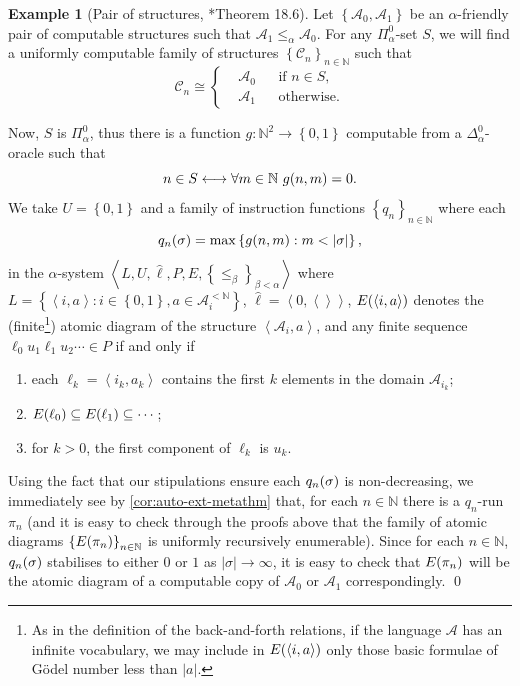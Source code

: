 \documentclass[11pt]{article}
\theoremstyle{plain}
\theoremstyle{definition}
\newtheorem*{example}{Example}
\newcommand{\tuple}[1]{\left\langle #1 \right\rangle}
\begin{document}
\begin{example}[Pair of structures, \cite{ash-knight00-computable-structures}*{Theorem 18.6}]
  Let $\left\{\mathcal{A}_0, \mathcal{A}_1\right\}$ be an $\alpha$-friendly pair of computable structures such that $\mathcal{A}_1 \leq_\alpha \mathcal{A}_0$. For any $\Pi^0_\alpha$-set $S$, we will find a uniformly computable family of structures $\left\{\mathcal{C}_n\right\}_{n \in \mathbb{N}}$ such that
  \[\mathcal{C}_n \cong \left\{\begin{aligned}
       & \mathcal{A}_0 &  & \text{if } n \in S, \\
       & \mathcal{A}_1 &  & \text{otherwise}.
    \end{aligned}\right.\]

  Now, $S$ is $\Pi^0_\alpha$, thus there is a function $g : \mathbb{N}^2 \rightarrow \left\{0, 1\right\}$ computable from a $\Delta^0_\alpha$-oracle such that
  \[n \in S \longleftrightarrow \forall m \in \mathbb{N} \ g\mleft(n, m\mright) = 0.\]
  We take $U = \left\{0, 1\right\}$ and a family of instruction functions $\left\{q_n\right\}_{n \in \mathbb{N}}$ where each
  \[q_n\mleft(\sigma\mright) = \max \left\{g\mleft(n, m\mright) : m < \left|\sigma\right|\right\},\]
  in the $\alpha$-system $\tuple{L, U, \hat{\ell}, P, E, \left\{\leq_\beta\right\}_{\beta < \alpha}}$ where $L = \left\{\tuple{i, a} : i \in \left\{0, 1\right\}, a \in \mathcal{A}_i^{<\mathbb{N}}\right\}$, $\hat{\ell} = \tuple{0, \tuple{}}$, $E\mleft(\tuple{i, a}\mright)$ denotes the (finite\footnote{As in the definition of the back-and-forth relations, if the language $\mathcal{A}$ has an infinite vocabulary, we may include in $E\mleft(\tuple{i, a}\mright)$ only those basic formulae of G\"odel number less than $\left|a\right|$.}) atomic diagram of the structure $\tuple{\mathcal{A}_i, a}$, and any finite sequence $\ell_0 u_1 \ell_1 u_2 \cdots \in P$ if and only if
  \begin{enumerate}[label=(\roman*)]
    \item each $\ell_k = \tuple{i_k, a_k}$ contains the first $k$ elements in the domain $\mathcal{A}_{i_k}$;
    \item $E\mleft(\ell_0\mright) \subseteq E\mleft(\ell_1\mright) \subseteq \cdots$;
    \item for $k > 0$, the first component of $\ell_k$ is $u_k$.
  \end{enumerate}
  Using the fact that our stipulations ensure each $q_n\mleft(\sigma\mright)$ is non-decreasing, we immediately see by \autoref{cor:auto-ext-metathm} that, for each $n \in \mathbb{N}$ there is a $q_n$-run $\pi_n$ (and it is easy to check through the proofs above that the family of atomic diagrams $\left\{E\mleft(\pi_n\mright)\right\}_{n \in \mathbb{N}}$ is uniformly recursively enumerable). Since for each $n \in \mathbb{N}$, $q_n\mleft(\sigma\mright)$ stabilises to either $0$ or $1$ as $\left|\sigma\right| \rightarrow \infty$, it is easy to check that $E\mleft(\pi_n\mright)$ will be the atomic diagram of a computable copy of $\mathcal{A}_0$ or $\mathcal{A}_1$ correspondingly. \qed
\end{example}
\end{document}
